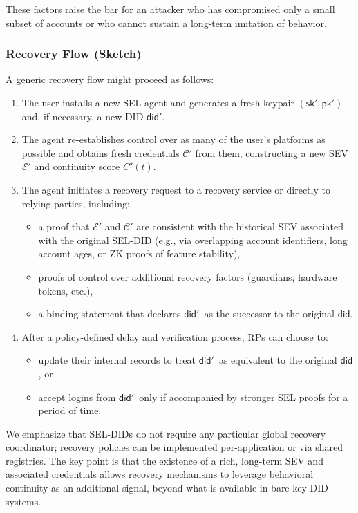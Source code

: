 \documentclass[11pt]{article}
\begin{document}
These factors raise the bar for an attacker who has compromised only a small subset of accounts or who cannot sustain a long-term imitation of behavior.

\subsubsection{Recovery Flow (Sketch)}

A generic recovery flow might proceed as follows:

\begin{enumerate}
  \item The user installs a new SEL agent and generates a fresh keypair $(\mathsf{sk}', \mathsf{pk}')$ and, if necessary, a new DID $\mathsf{did}'$.
  \item The agent re-establishes control over as many of the user's platforms as possible and obtains fresh credentials $\mathcal{C}'$ from them, constructing a new SEV $\mathcal{E}'$ and continuity score $C'(t)$.
  \item The agent initiates a recovery request to a recovery service or directly to relying parties, including:
  \begin{itemize}
    \item a proof that $\mathcal{E}'$ and $\mathcal{C}'$ are consistent with the historical SEV associated with the original SEL-DID (e.g., via overlapping account identifiers, long account ages, or ZK proofs of feature stability),
    \item proofs of control over additional recovery factors (guardians, hardware tokens, etc.),
    \item a binding statement that declares $\mathsf{did}'$\ as the successor to the original $\mathsf{did}$.
  \end{itemize}
  \item After a policy-defined delay and verification process, RPs can choose to:
  \begin{itemize}
    \item update their internal records to treat $\mathsf{did}'$\ as equivalent to the original $\mathsf{did}$, or
    \item accept logins from $\mathsf{did}'$\ only if accompanied by stronger SEL proofs for a period of time.
  \end{itemize}
\end{enumerate}

We emphasize that SEL-DIDs do not require any particular global recovery coordinator; recovery policies can be implemented per-application or via shared registries. The key point is that the existence of a rich, long-term SEV and associated credentials allows recovery mechanisms to leverage behavioral continuity as an additional signal, beyond what is available in bare-key DID systems.
\end{document}
